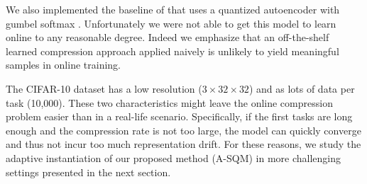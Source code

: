 \documentclass[colorinlistoftodos]{article} %
\newcommand\mynotesLC[1]{\textcolor{blue}{#1}}
\begin{document}
We also implemented the baseline of \cite{riemer2018learning} that uses a quantized autoencoder with gumbel softmax \citep{jang2016categorical}. Unfortunately we were not able to get this model to learn online to any reasonable degree. Indeed we emphasize that an off-the-shelf learned compression approach applied naively is unlikely to yield meaningful samples in online training. 

The CIFAR-10 dataset has a low resolution ($3 \times 32 \times 32$) and as lots of data per task (10,000). These two characteristics might leave the online compression problem easier than in a real-life scenario. Specifically, if the first tasks are long enough and the compression rate is not too large, the model can quickly converge and thus not incur too much representation drift. For these reasons, we study the adaptive instantiation of our proposed method (A-SQM) in more challenging settings presented in the next section. 



\end{document}
